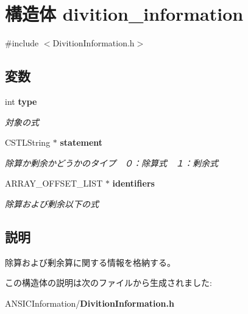 \section{構造体 divition\_\-information}
\label{structdivition__information}


{\ttfamily \#include $<$DivitionInformation.h$>$}

\subsection*{変数}
\begin{DoxyCompactItemize}
\item 
int {\bf type}\label{structdivition__information_a47c7af44ae5f360dc369efd35b72129e}

\begin{DoxyCompactList}\small\item\em 対象の式 \item\end{DoxyCompactList}\item 
CSTLString $\ast$ {\bf statement}\label{structdivition__information_ad79d014f72312183ee99402b6b2001e9}

\begin{DoxyCompactList}\small\item\em 除算か剰余かどうかのタイプ　０：除算式　１：剰余式 \item\end{DoxyCompactList}\item 
ARRAY\_\-OFFSET\_\-LIST $\ast$ {\bf identifiers}\label{structdivition__information_aef16f1ef4d1f8cb9e2440017dd8c004f}

\begin{DoxyCompactList}\small\item\em 除算および剰余以下の式 \item\end{DoxyCompactList}\end{DoxyCompactItemize}


\subsection{説明}
除算および剰余算に関する情報を格納する。 

この構造体の説明は次のファイルから生成されました:\begin{DoxyCompactItemize}
\item 
ANSICInformation/{\bf DivitionInformation.h}\end{DoxyCompactItemize}
